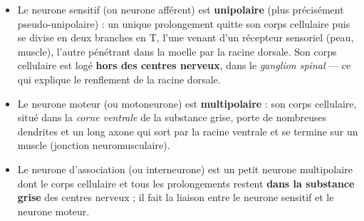 \documentclass[11pt]{article}
\newcommand{\cle}[1]{{\popxbold\color{popdark}#1}}
\begin{document}
\begin{itemize}
\item Le \cle{neurone sensitif} (ou neurone afférent) est \textbf{unipolaire} (plus précisément pseudo-unipolaire) : un unique prolongement quitte son corps cellulaire puis se divise en deux branches en T, l'une venant d'un récepteur sensoriel (peau, muscle), l'autre pénétrant dans la moelle par la racine dorsale. Son corps cellulaire est logé \textbf{hors des centres nerveux}, dans le \emph{ganglion spinal} — ce qui explique le renflement de la racine dorsale.
\item Le \cle{neurone moteur} (ou motoneurone) est \textbf{multipolaire} : son corps cellulaire, situé dans la \emph{corne ventrale} de la substance grise, porte de nombreuses dendrites et un long axone qui sort par la racine ventrale et se termine sur un muscle (jonction neuromusculaire).
\item Le \cle{neurone d'association} (ou interneurone) est un petit neurone multipolaire dont le corps cellulaire et tous les prolongements restent \textbf{dans la substance grise} des centres nerveux ; il fait la liaison entre le neurone sensitif et le neurone moteur.
\end{itemize}
\end{document}
